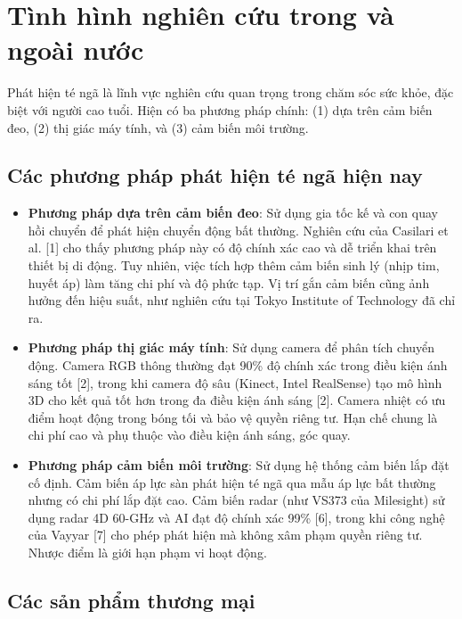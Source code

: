 \documentclass[a4paper,12pt]{report}
\begin{document}
	\setlength{\parindent}{1cm}
	\section{Tình hình nghiên cứu trong và ngoài nước}
	
	Phát hiện té ngã là lĩnh vực nghiên cứu quan trọng trong chăm sóc sức khỏe, đặc biệt với người cao tuổi. Hiện có ba phương pháp chính: (1) dựa trên cảm biến đeo, (2) thị giác máy tính, và (3) cảm biến môi trường.
	
	\subsection{Các phương pháp phát hiện té ngã hiện nay}
	
	\begin{itemize}
		\item \textbf{Phương pháp dựa trên cảm biến đeo}: Sử dụng gia tốc kế và con quay hồi chuyển để phát hiện chuyển động bất thường. Nghiên cứu của Casilari et al. [1] cho thấy phương pháp này có độ chính xác cao và dễ triển khai trên thiết bị di động. Tuy nhiên, việc tích hợp thêm cảm biến sinh lý (nhịp tim, huyết áp) làm tăng chi phí và độ phức tạp. Vị trí gắn cảm biến cũng ảnh hưởng đến hiệu suất, như nghiên cứu tại Tokyo Institute of Technology đã chỉ ra.
		
		\item \textbf{Phương pháp thị giác máy tính}: Sử dụng camera để phân tích chuyển động. Camera RGB thông thường đạt 90\% độ chính xác trong điều kiện ánh sáng tốt [2], trong khi camera độ sâu (Kinect, Intel RealSense) tạo mô hình 3D cho kết quả tốt hơn trong đa điều kiện ánh sáng [2]. Camera nhiệt có ưu điểm hoạt động trong bóng tối và bảo vệ quyền riêng tư. Hạn chế chung là chi phí cao và phụ thuộc vào điều kiện ánh sáng, góc quay.
		
		\item \textbf{Phương pháp cảm biến môi trường}: Sử dụng hệ thống cảm biến lắp đặt cố định. Cảm biến áp lực sàn phát hiện té ngã qua mẫu áp lực bất thường nhưng có chi phí lắp đặt cao. Cảm biến radar (như VS373 của Milesight) sử dụng radar 4D 60-GHz và AI đạt độ chính xác 99\% [6], trong khi công nghệ của Vayyar [7] cho phép phát hiện mà không xâm phạm quyền riêng tư. Nhược điểm là giới hạn phạm vi hoạt động.
	\end{itemize}
	\subsection{Các sản phẩm thương mại}
	
\end{document}
